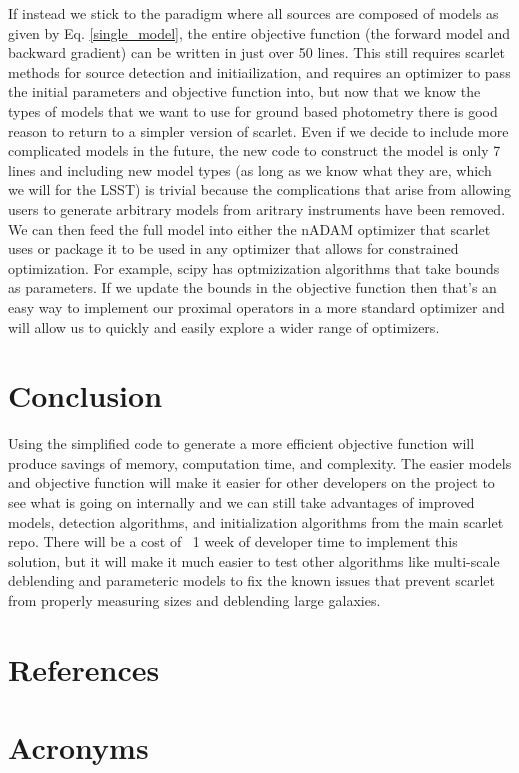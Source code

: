 \documentclass[DM,authoryear,toc]{lsstdoc}
\begin{document}
If instead we stick to the paradigm where all sources are composed of models as given by Eq. \ref{single_model}, the entire objective function (the forward model and backward gradient) can be written in just over 50 lines. This still requires scarlet methods for source detection and initiailization, and requires an optimizer to pass the initial parameters and objective function into, but now that we know the types of models that we want to use for ground based photometry there is good reason to return to a simpler version of scarlet. Even if we decide to include more complicated models in the future, the new code to construct the model is only 7 lines and including new model types (as long as we know what they are, which we will for the LSST) is trivial because the complications that arise from allowing users to generate arbitrary models from aritrary instruments have been removed. We can then feed the full model into either the nADAM optimizer that scarlet uses or package it to be used in any optimizer that allows for constrained optimization. For example, scipy has optmizization algorithms that take bounds as parameters. If we update the bounds in the objective function then that's an easy way to implement our proximal operators in a more standard optimizer and will allow us to quickly and easily explore a wider range of optimizers.

\section{Conclusion}

Using the simplified code to generate a more efficient objective function will produce savings of memory, computation time, and complexity. The easier models and objective function will make it easier for other developers on the project to see what is going on internally and we can still take advantages of improved models, detection algorithms, and initialization algorithms from the main scarlet repo. There will be a cost of ~1 week of developer time to implement this solution, but it will make it much easier to test other algorithms like multi-scale deblending and parameteric models to fix the known issues that prevent scarlet from properly measuring sizes and deblending large galaxies.

\appendix
\section{References} \label{sec:bib}
\renewcommand{\refname}{} %


\section{Acronyms} \label{sec:acronyms}

\end{document}
